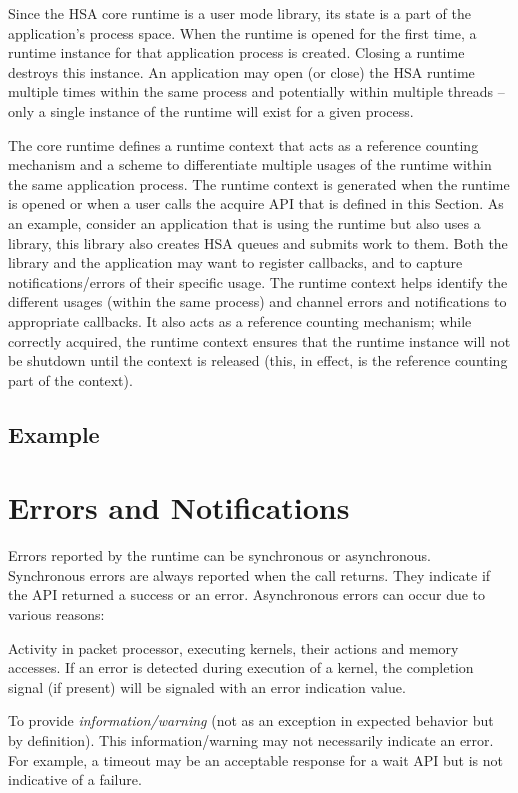 \documentclass[final]{book}
\begin{document}
Since the HSA core runtime is a user mode library, its state is a part of the
application's process space. When the runtime is opened for the first time, a
runtime instance for that application process is created. Closing a runtime
destroys this instance. An application may open (or close) the HSA runtime
multiple times within the same process and potentially within multiple threads
-- only a single instance of the runtime will exist for a given process.

The core runtime defines a runtime context that acts as a reference counting
mechanism and a scheme to differentiate multiple usages of the runtime within
the same application process. The runtime context is generated when the runtime
is opened or when a user calls the acquire API that is defined in this
Section. As an example, consider an application that is using the runtime but
also uses a library, this library also creates HSA queues and submits work to
them. Both the library and the application may want to register callbacks, and
to capture notifications/errors of their specific usage. The runtime context
helps identify the different usages (within the same process) and channel errors
and notifications to appropriate callbacks. It also acts as a reference counting
mechanism; while correctly acquired, the runtime context ensures that
the runtime instance will not be shutdown until the context is released
(this, in effect, is the reference counting part of the context).

\subsection{Example}


\section{Errors and Notifications}
\label{error}

Errors reported by the runtime can be synchronous or asynchronous. Synchronous
errors are always reported when the call returns. They indicate if the API
returned a success or an error. Asynchronous errors can occur due to various
reasons:\begin{inparaenum}[(i)]
\item Activity in packet processor, executing kernels, their actions and memory
  accesses. If an error is detected during execution of a kernel, the completion
  signal (if present) will be signaled with an error indication value.
\item To provide \textit{information/warning} (not as an exception in expected
  behavior but by definition). This information/warning may not necessarily
  indicate an error. For example, a timeout may be an acceptable response for a
  wait API but is not indicative of a failure.
\end{inparaenum}
\end{document}
